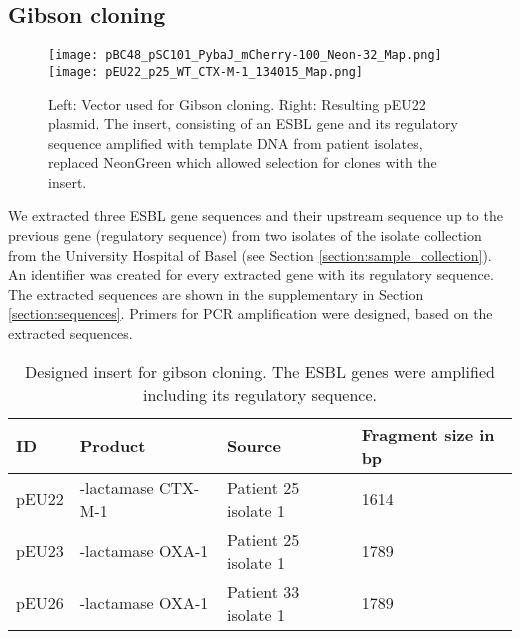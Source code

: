 \subsection{Gibson cloning}
\begin{figure}
	\texttt{[image: pBC48\_pSC101\_PybaJ\_mCherry-100\_Neon-32\_Map.png]}
	\texttt{[image: pEU22\_p25\_WT\_CTX-M-1\_134015\_Map.png]}
	\caption{Left: Vector used for Gibson cloning. Right: Resulting pEU22 plasmid. The insert, consisting of an ESBL gene and its regulatory sequence amplified with template DNA from patient isolates, replaced NeonGreen which allowed selection for clones with the insert.}
	\label{figure:vec}
\end{figure}
We extracted three ESBL gene sequences and their upstream sequence up to the previous gene (regulatory sequence) from two isolates of the isolate collection from the University Hospital of Basel (see Section \ref{section:sample_collection}). An identifier was created for every extracted gene with its regulatory sequence. The extracted sequences are shown in the supplementary in Section \ref{section:sequences}. Primers for PCR amplification were designed, based on the extracted sequences.
\begin{table}[H]
	\begin{tabular}{|llll|} \hline
		ID    & Product                & Source             	& Fragment size in bp \\ \hline
		pEU22 & \textbeta-lactamase CTX-M-1 & Patient 25 isolate 1 &	1614 \\ \hline
		pEU23 & \textbeta-lactamase OXA-1   & Patient 25 isolate 1 & 1789\\ \hline
		pEU26 & \textbeta-lactamase OXA-1   & Patient 33 isolate 1 & 1789\\ \hline
	\end{tabular}
	\label{table:plasmid}
	\caption{Designed insert for gibson cloning. The ESBL genes were amplified including its regulatory sequence. }
\end{table}
